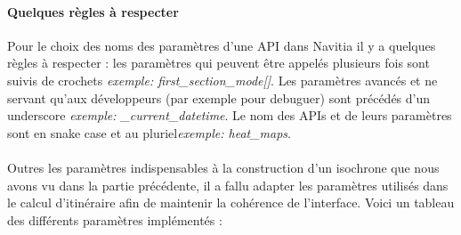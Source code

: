 \documentclass[a4paper]{report}
\begin{document}
\paragraph{Quelques règles à respecter} Pour le choix des noms des paramètres d'une API dans Navitia il y a quelques règles à respecter : les paramètres qui peuvent être appelés plusieurs fois sont suivis de crochets \emph{exemple: first\_section\_mode[]}. Les paramètres avancés et ne servant qu'aux développeurs (par exemple pour debuguer) sont précédés d'un underscore \emph{exemple: \_current\_datetime}. Le nom des APIs et de leurs paramètres sont en snake case et au pluriel\emph{exemple: heat\_maps}.

\paragraph{} Outres les paramètres indispensables à la construction d'un isochrone que nous avons vu dans la partie précédente, il a fallu adapter les paramètres utilisés dans le calcul d'itinéraire afin de maintenir la cohérence de l'interface. Voici un tableau des différents paramètres implémentés :
\end{document}
